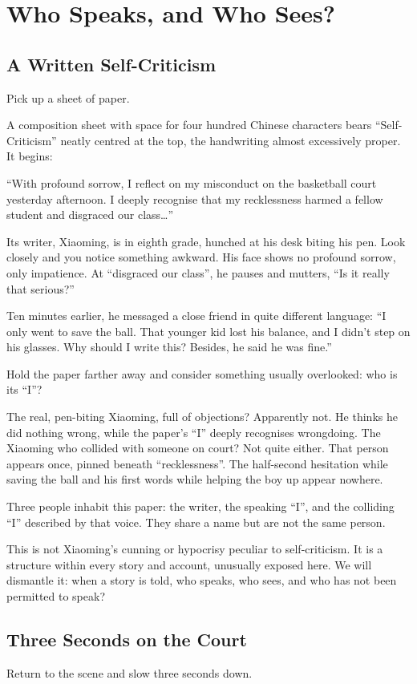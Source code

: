 \chapter{Who Speaks, and Who Sees?}
\section{A Written Self-Criticism}
Pick up a sheet of paper.

A composition sheet with space for four hundred Chinese characters bears ``Self-Criticism'' neatly centred at the top, the handwriting almost excessively proper. It begins:

``With profound sorrow, I reflect on my misconduct on the basketball court yesterday afternoon. I deeply recognise that my recklessness harmed a fellow student and disgraced our class\ldots''

Its writer, Xiaoming, is in eighth grade, hunched at his desk biting his pen. Look closely and you notice something awkward. His face shows no profound sorrow, only impatience. At ``disgraced our class'', he pauses and mutters, ``Is it really that serious?''

Ten minutes earlier, he messaged a close friend in quite different language: ``I only went to save the ball. That younger kid lost his balance, and I didn't step on his glasses. Why should I write this? Besides, he said he was fine.''

Hold the paper farther away and consider something usually overlooked: who is its ``I''?

The real, pen-biting Xiaoming, full of objections? Apparently not. He thinks he did nothing wrong, while the paper's ``I'' deeply recognises wrongdoing. The Xiaoming who collided with someone on court? Not quite either. That person appears once, pinned beneath ``recklessness''. The half-second hesitation while saving the ball and his first words while helping the boy up appear nowhere.

Three people inhabit this paper: the writer, the speaking ``I'', and the colliding ``I'' described by that voice. They share a name but are not the same person.

This is not Xiaoming's cunning or hypocrisy peculiar to self-criticism. It is a structure within every story and account, unusually exposed here. We will dismantle it: when a story is told, who speaks, who sees, and who has not been permitted to speak?

\section{Three Seconds on the Court}
Return to the scene and slow three seconds down.

